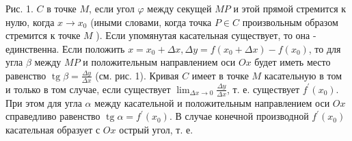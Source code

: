 \documentclass[10pt]{article}
\begin{document}
Рис. 1. $C$ в точке $M$, если угол $\varphi$ между секущей $M P$ и этой прямой стремится к нулю, когда $x \rightarrow x_{0}$ (иными словами, когда точка $P \in C$ произвольным образом стремится к точке $M$ ). Если упомянутая касательная существует, то она - единственна. Если положить $x=x_{0}+\Delta x, \Delta y=f\left(x_{0}+\Delta x\right)-f\left(x_{0}\right)$, то для угла $\beta$ между $M P$ и положительным направлением оси $O x$ будет иметь место равенство $\operatorname{tg} \beta=\frac{\Delta y}{\Delta x}$ (см. рис. 1). Кривая $C$ имеет в точке $M$ касательную в том и только в том случае, если существует $\lim _{\Delta x \rightarrow 0} \frac{\Delta y}{\Delta x}$, т. е. существует $f^{\prime}\left(x_{0}\right)$. При этом для угла $\alpha$ между касательной и положительным направлением оси $O x$ справедливо равенство $\operatorname{tg} \alpha=f^{\prime}\left(x_{0}\right)$. В случае конечной производной $f^{\prime}\left(x_{0}\right)$ касательная образует с $O x$ острый угол, т. е.
\end{document}
